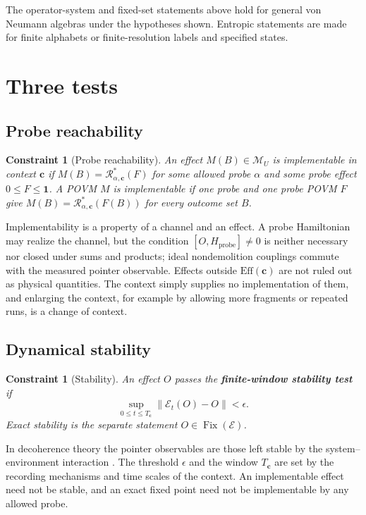 \documentclass[12pt,a4paper]{article}
\newtheorem{constraint}[theorem]{Constraint}
\begin{document}
The operator-system and fixed-set statements above hold for general von Neumann algebras under the hypotheses shown. Entropic statements are made for finite alphabets or finite-resolution labels and specified states.

\section{Three tests}
\label{sec:tests}

\subsection{Probe reachability}

\begin{constraint}[Probe reachability]
\label{const:interaction}
An effect $M(B)\in\mathcal M_U$ is implementable in context $\mathbf c$ if $M(B)=\mathcal R_{\alpha,\mathbf c}^{*}(F)$ for some allowed probe $\alpha$ and some probe effect $0\le F\le\mathbf1$. A POVM $M$ is implementable if one probe and one probe POVM $F$ give $M(B)=\mathcal R_{\alpha,\mathbf c}^{*}(F(B))$ for every outcome set $B$.
\end{constraint}

Implementability is a property of a channel and an effect. A probe Hamiltonian may realize the channel, but the condition $[O,H_{\mathrm{probe}}]\ne0$ is neither necessary nor closed under sums and products; ideal nondemolition couplings commute with the measured pointer observable. Effects outside $\mathrm{Eff}(\mathbf c)$ are not ruled out as physical quantities. The context simply supplies no implementation of them, and enlarging the context, for example by allowing more fragments or repeated runs, is a change of context.

\subsection{Dynamical stability}

\begin{constraint}[Stability]
\label{const:stability}
An effect $O$ passes the \textbf{finite-window stability test} if
\begin{equation}
\sup_{0\le t\le T_{\mathbf c}}\|\mathcal{E}_t(O) - O\| < \epsilon .
\end{equation}
Exact stability is the separate statement $O\in\operatorname{Fix}(\mathcal E)$.
\end{constraint}

In decoherence theory the pointer observables are those left stable by the system--environment interaction \cite{Zurek2003}. The threshold $\epsilon$ and the window $T_{\mathbf c}$ are set by the recording mechanisms and time scales of the context. An implementable effect need not be stable, and an exact fixed point need not be implementable by any allowed probe.
\end{document}

